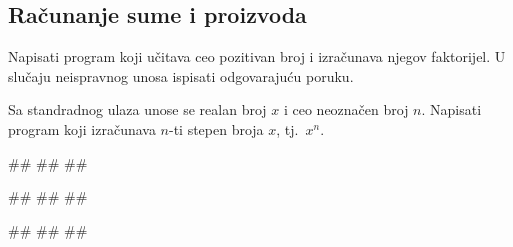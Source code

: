 \subsection{Računanje sume i proizvoda}

\begin{Exercise}[label=v1.3_03] 
 Napisati program koji učitava ceo pozitivan broj i izračunava njegov
 faktorijel. U slučaju neispravnog unosa ispisati odgovarajuću poruku. 
\end{Exercise}
\begin{Answer}[ref=v1.3_03]
\end{Answer}


\begin{Exercise}[label=p1.3_08] 
 Sa standradnog ulaza unose se realan broj $x$ i ceo neoznačen broj
 $n$. Napisati program koji izračunava $n$-ti stepen broja $x$, tj.~$x^n$. 
 
\begin{miditest}
\begin{upotreba}{1}
#\naslovInt#
##
##
\end{upotreba}
\end{miditest}
\begin{miditest}
\begin{upotreba}{2}
#\naslovInt#
##
##
\end{upotreba}
\end{miditest}

\begin{miditest}
\begin{upotreba}{3}
#\naslovInt#
##
##
\end{upotreba}
\end{miditest}
\end{Exercise}
\begin{Answer}[ref=p1.3_08]
\end{Answer}

